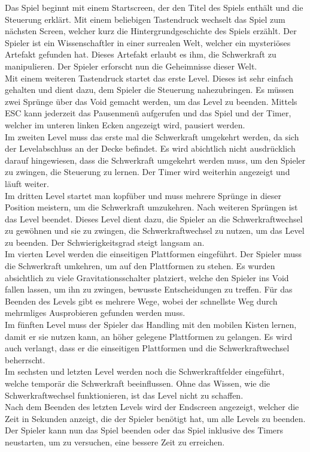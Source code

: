 \documentclass{article}
\begin{document}
Das Spiel beginnt mit einem Startscreen, der den Titel des Spiels enthält und die Steuerung erklärt. Mit einem beliebigen Tastendruck wechselt das Spiel zum nächsten Screen, welcher
kurz die Hintergrundgeschichte des Spiels erzählt. Der Spieler ist ein Wissenschaftler in einer surrealen Welt, welcher ein mysteriöses Artefakt gefunden hat. Dieses Artefakt erlaubt
es ihm, die Schwerkraft zu manipulieren. Der Spieler erforscht nun die Geheimnisse dieser Welt.
\\
Mit einem weiteren Tastendruck startet das erste Level. Dieses ist sehr einfach gehalten und dient dazu, dem Spieler die Steuerung nahezubringen. Es müssen zwei Sprünge über das Void
gemacht werden, um das Level zu beenden. Mittels ESC kann jederzeit das Pausenmenü aufgerufen und das Spiel und der Timer, welcher im unteren linken Ecken angezeigt wird, pausiert werden.
\\
Im zweiten Level muss das erste mal die Schwerkraft umgekehrt werden, da sich der Levelabschluss an der Decke befindet. Es wird abichtlich nicht ausdrücklich darauf hingewiesen, dass die
Schwerkraft umgekehrt werden muss, um den Spieler zu zwingen, die Steuerung zu lernen. Der Timer wird weiterhin angezeigt und läuft weiter.
\\
Im dritten Level startet man kopfüber und muss mehrere Sprünge in dieser Position meistern, um die Schwerkraft umzukehren. Nach weiteren Sprüngen ist das Level beendet. Dieses Level
dient dazu, die Spieler an die Schwerkraftwechsel zu gewöhnen und sie zu zwingen, die Schwerkraftwechsel zu nutzen, um das Level zu beenden. Der Schwierigkeitsgrad steigt langsam an.
\\
Im vierten Level werden die einseitigen Plattformen eingeführt. Der Spieler muss die Schwerkraft umkehren, um auf den Plattformen zu stehen. Es wurden absichtlich zu viele Gravitationsschalter 
platziert, welche den Spieler ins Void fallen lassen, um ihn zu zwingen, bewusste Entscheidungen zu treffen. Für das Beenden des Levels gibt es mehrere Wege, wobei der schnellste Weg
durch mehrmliges Ausprobieren gefunden werden muss.
\\
Im fünften Level muss der Spieler das Handling mit den mobilen Kisten lernen, damit er sie nutzen kann, an höher gelegene Plattformen zu gelangen. Es wird auch verlangt, dass er die einseitigen
Plattformen und die Schwerkraftwechsel beherrscht.
\\
Im sechsten und letzten Level werden noch die Schwerkraftfelder eingeführt, welche temporär die Schwerkraft beeinflussen. Ohne das Wissen, wie die Schwerkraftwechsel funktionieren, ist das
Level nicht zu schaffen.
\\
Nach dem Beenden des letzten Levels wird der Endscreen angezeigt, welcher die Zeit in Sekunden anzeigt, die der Spieler benötigt hat, um alle Levels zu beenden. Der Spieler kann nun das Spiel beenden
oder das Spiel inklusive des Timers neustarten, um zu versuchen, eine bessere Zeit zu erreichen.
\end{document}
